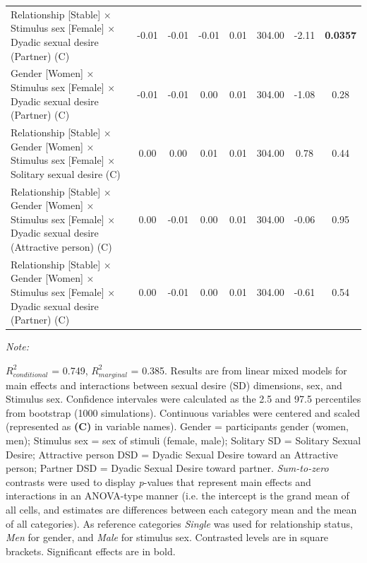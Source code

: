 \documentclass[
  bookmarksnumbered]{article}
\begin{document}
\begin{table}[H]
{\begin{threeparttable}
\begin{tabular}[t]{lccccccc}
Relationship [Stable] × Stimulus sex [Female] × Dyadic sexual desire (Partner) (C) & -0.01 & -0.01 & -0.01 & 0.01 & 304.00 & -2.11 & \textbf{0.0357}\\
Gender [Women] × Stimulus sex [Female] × Dyadic sexual desire (Partner) (C) & -0.01 & -0.01 & 0.00 & 0.01 & 304.00 & -1.08 & 0.28\\
Relationship [Stable] × Gender [Women] × Stimulus sex [Female] × Solitary sexual desire (C) & 0.00 & 0.00 & 0.01 & 0.01 & 304.00 & 0.78 & 0.44\\
Relationship [Stable] × Gender [Women] × Stimulus sex [Female] × Dyadic sexual desire (Attractive person) (C) & 0.00 & -0.01 & 0.00 & 0.01 & 304.00 & -0.06 & 0.95\\
Relationship [Stable] × Gender [Women] × Stimulus sex [Female] × Dyadic sexual desire (Partner) (C) & 0.00 & -0.01 & 0.00 & 0.01 & 304.00 & -0.61 & 0.54\\
\bottomrule
\end{tabular}
\begin{tablenotes}[para]
\item \textit{Note: } 
\item $R^2_{conditional}$ = 0.749, $R^2_{marginal}$ = 0.385. Results are from linear mixed models for main 
                              effects and interactions between sexual desire (SD) dimensions,
                              sex, and Stimulus sex.
                              Confidence intervales were calculated as the 2.5 and 97.5 
                              percentiles from bootstrap (1000 simulations).
                              Continuous variables were centered and scaled
                              (represented as \textbf{(C)} in variable names).
                              Gender = participants gender (women, men); 
                              Stimulus sex = sex of stimuli (female, male); 
                              Solitary SD = Solitary Sexual Desire;
                              Attractive person DSD = Dyadic Sexual Desire toward an 
                              Attractive person;
                              Partner DSD = Dyadic Sexual Desire toward partner.
                              \textit{Sum-to-zero} contrasts were used to display
                              \textit{p}-values that represent main effects and interactions 
                              in an ANOVA-type manner (i.e. the intercept is the grand mean of 
                              all cells, and estimates are differences between each category
                              mean and the mean of all categories).
                              As reference categories 
                              \textit{Single} was used for relationship status,
                              \textit{Men} for gender,
                              and \textit{Male} for stimulus sex. 
                              Contrasted levels are in square brackets. 
                              Significant effects are in bold.
\end{tablenotes}
\end{threeparttable}}
\end{table}
\end{document}
